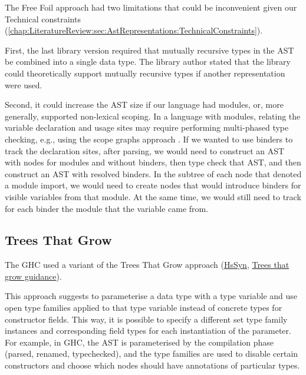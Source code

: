 The Free Foil approach had two limitations that could be inconvenient given our Technical constraints (\cref{chap:LiteratureReview:sec:AstRepresentations:TechnicalConstraints}).

First, the last library version required that mutually recursive types in the AST be combined into a single data type. The library author stated that the library could theoretically support mutually recursive types if another representation were used.

Second, it could increase the AST size if our language had modules, or, more generally, supported non-lexical scoping.
In a language with modules, relating the variable declaration and usage sites may require performing multi-phased type checking, e.g., using the scope graphs approach \cite{poulsen-monadic-2023}.
If we wanted to use binders to track the declaration sites, after parsing, we would need to construct an AST with nodes for modules and without binders, then type check that AST, and then construct an AST with resolved binders.
In the subtree of each node that denoted a module import, we would need to create nodes that would introduce binders for visible variables from that module.
At the same time, we would still need to track for each binder the module that the variable came from.

\subsection{Trees That Grow}
\label{chap:LiteratureReview:sec:AstRepresentations:TreesThatGrow}

The GHC used a variant of the Trees That Grow \cite{najd-trees-2016} approach (\href{https://gitlab.haskell.org/ghc/ghc/-/wikis/implementing-trees-that-grow/hs-syn}{HsSyn}, \href{https://gitlab.haskell.org/ghc/ghc/-/wikis/implementing-trees-that-grow/trees-that-grow-guidance}{Trees that grow guidance}).

This approach suggests to parameterise a data type with a type variable and use open type families applied to that type variable instead of concrete types for constructor fields. This way, it is possible to specify a different set type family instances and corresponding field types for each instantiation of the parameter. For example, in GHC, the AST is parameterised by the compilation phase (parsed, renamed, typechecked), and the type families are used to disable certain constructors and choose which nodes should have annotations of particular types.

